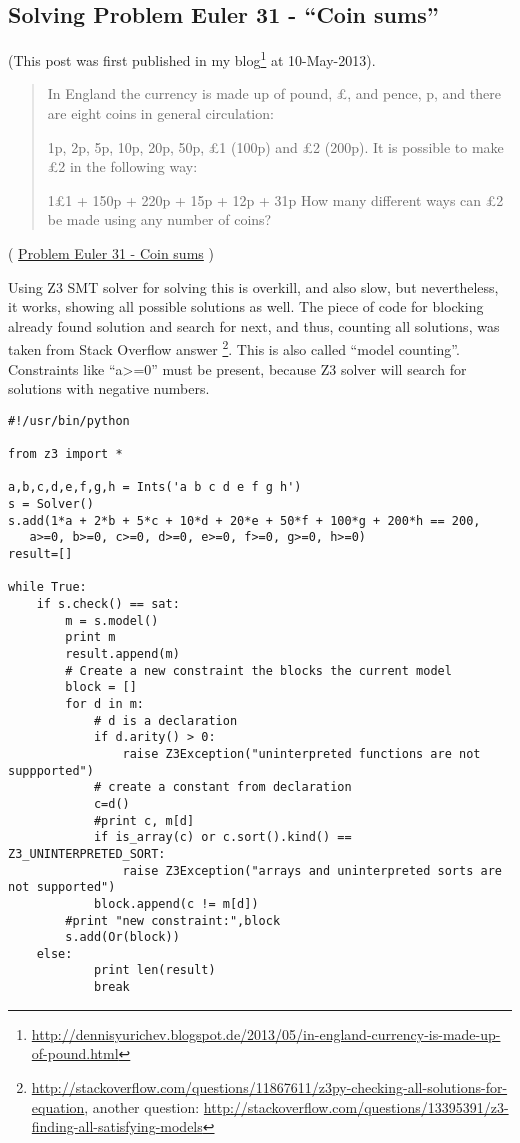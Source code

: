 \subsection{Solving Problem Euler 31 - ``Coin sums''}

(This post was first published in my blog\footnote{\url{http://dennisyurichev.blogspot.de/2013/05/in-england-currency-is-made-up-of-pound.html}} at 10-May-2013).

\begin{framed}
\begin{quotation}
In England the currency is made up of pound, £, and pence, p, and there are eight coins in general circulation:

1p, 2p, 5p, 10p, 20p, 50p, £1 (100p) and £2 (200p).
It is possible to make £2 in the following way:

1£1 + 150p + 220p + 15p + 12p + 31p
How many different ways can £2 be made using any number of coins?
\end{quotation}
\end{framed}
( \href{http://projecteuler.net/problem=31}{Problem Euler 31 - Coin sums} )

\label{SMTEnumerate}
Using Z3 SMT solver for solving this is overkill, and also slow, but nevertheless, it works, showing all possible solutions as well.
The piece of code for blocking already found solution and search for next, and thus, counting all solutions, was taken from Stack Overflow answer
\footnote{\url{http://stackoverflow.com/questions/11867611/z3py-checking-all-solutions-for-equation}, 
another question: \url{http://stackoverflow.com/questions/13395391/z3-finding-all-satisfying-models}}.
This is also called ``model counting''.
Constraints like ``a>=0'' must be present, because Z3 solver will search for solutions with negative numbers.

\begin{lstlisting}
#!/usr/bin/python

from z3 import *

a,b,c,d,e,f,g,h = Ints('a b c d e f g h')
s = Solver()
s.add(1*a + 2*b + 5*c + 10*d + 20*e + 50*f + 100*g + 200*h == 200, 
   a>=0, b>=0, c>=0, d>=0, e>=0, f>=0, g>=0, h>=0)
result=[]

while True:
    if s.check() == sat:
        m = s.model()
        print m
        result.append(m)
        # Create a new constraint the blocks the current model
        block = []
        for d in m:
            # d is a declaration
            if d.arity() > 0:
                raise Z3Exception("uninterpreted functions are not suppported")
            # create a constant from declaration
            c=d()
            #print c, m[d]
            if is_array(c) or c.sort().kind() == Z3_UNINTERPRETED_SORT:
                raise Z3Exception("arrays and uninterpreted sorts are not supported")
            block.append(c != m[d])
        #print "new constraint:",block
        s.add(Or(block))
    else:
            print len(result)
            break
\end{lstlisting}

